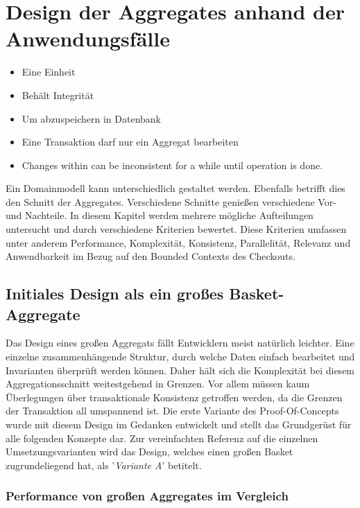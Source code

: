 \chapter{Design der Aggregates anhand der Anwendungsfälle}
\begin{itemize}[noitemsep,nolistsep]
	\item Eine Einheit
	\item Behält Integrität
	\item Um abzuspeichern in Datenbank
	\item Eine Transaktion darf nur ein Aggregat bearbeiten
	\item Changes within can be inconsistent for a while until operation is done.
\end{itemize}


Ein Domainmodell kann unterschiedlich gestaltet werden. Ebenfalls betrifft dies den Schnitt der Aggregates. Verschiedene Schnitte genießen verschiedene Vor- und Nachteile. In diesem Kapitel werden mehrere mögliche Aufteilungen untersucht und durch verschiedene Kriterien bewertet. Diese Kriterien umfassen unter anderem Performance, Komplexität, Konsistenz, Parallelität, Relevanz und Anwendbarkeit im Bezug auf den Bounded Contexts des Checkouts.

\section{Initiales Design als ein großes Basket-Aggregate}

Das Design eines großen Aggregats fällt Entwicklern meist natürlich leichter. Eine einzelne zusammenhängende Struktur, durch welche Daten einfach bearbeitet und Invarianten überprüft werden können. Daher hält sich die Komplexität bei diesem Aggregationsschnitt weitestgehend in Grenzen. Vor allem müssen kaum Überlegungen über transaktionale Konsistenz getroffen werden, da die Grenzen der Transaktion all umspannend ist. Die erste Variante des Proof-Of-Concepts wurde mit diesem Design im Gedanken entwickelt und stellt das Grundgerüst für alle folgenden Konzepte dar. Zur vereinfachten Referenz auf die einzelnen Umsetzungsvarianten wird das Design, welches einen großen Basket zugrundeliegend hat, als '\emph{Variante A}' betitelt.


\subsection{Performance von großen Aggregates im Vergleich}

